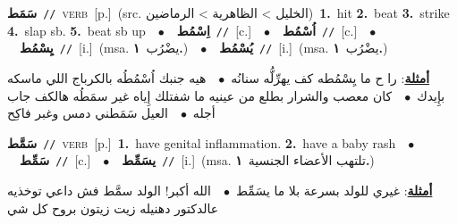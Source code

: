 \documentclass[10pt,a4paper,twoside]{article} %
\begin{document}
\begin{multicols}{2}
{\setlength\topsep{0pt}\textbf{\foreignlanguage{arabic}{سَمَط}}\ {\color{gray}\texttt{//}\color{black}}\ \textsc{verb}\ [p.]\ (src. \color{gray}\foreignlanguage{arabic}{الخليل > الظاهرية > الرماضين}\color{black})\ \textbf{1.}~hit  \textbf{2.}~beat  \textbf{3.}~strike  \textbf{4.}~slap sb.  \textbf{5.}~beat sb up\ \ $\bullet$\ \ \setlength\topsep{0pt}\textbf{\foreignlanguage{arabic}{اِسْمُط}}\ {\color{gray}\texttt{//}\color{black}}\ [c.]\ \ $\bullet$\ \ \setlength\topsep{0pt}\textbf{\foreignlanguage{arabic}{اُسْمُط}}\ {\color{gray}\texttt{//}\color{black}}\ [c.]\ \ $\bullet$\ \ \setlength\topsep{0pt}\textbf{\foreignlanguage{arabic}{يِسْمُط}}\ {\color{gray}\texttt{//}\color{black}}\ [i.]\ \color{gray}(msa. \foreignlanguage{arabic}{يضْرُب}~\foreignlanguage{arabic}{\textbf{١.}})\color{black}\ \ $\bullet$\ \ \setlength\topsep{0pt}\textbf{\foreignlanguage{arabic}{يُسْمُط}}\ {\color{gray}\texttt{//}\color{black}}\ [i.]\ \color{gray}(msa. \foreignlanguage{arabic}{يضْرُب}~\foreignlanguage{arabic}{\textbf{١.}})\color{black}\  \begin{flushright}\color{gray}\foreignlanguage{arabic}{\textbf{\underline{\foreignlanguage{arabic}{أمثلة}}}: را ح ما يِسْمُطه كف يهرِّلُّه سنانُه\ $\bullet$\ \  هيه جنبك اُسْمُطُه بالكرباج اللي ماسكه بإِيدك\ $\bullet$\ \  كان معصب والشرار بطلع من عينيه ما شفتلك إِياه غير سمَطُه هالكف جاب أجله\ $\bullet$\ \  العيل سَمَطني دمس وغبر فاكِح}\end{flushright}\color{black}} \vspace{2mm}

{\setlength\topsep{0pt}\textbf{\foreignlanguage{arabic}{سَمَّط}}\ {\color{gray}\texttt{//}\color{black}}\ \textsc{verb}\ [p.]\ \textbf{1.}~have genital inflammation.  \textbf{2.}~have a baby rash\ \ $\bullet$\ \ \setlength\topsep{0pt}\textbf{\foreignlanguage{arabic}{سَمِّط}}\ {\color{gray}\texttt{//}\color{black}}\ [c.]\ \ $\bullet$\ \ \setlength\topsep{0pt}\textbf{\foreignlanguage{arabic}{يسَمِّط}}\ {\color{gray}\texttt{//}\color{black}}\ [i.]\ \color{gray}(msa. \foreignlanguage{arabic}{تلتهب الأعضاء الجنسية}~\foreignlanguage{arabic}{\textbf{١.}})\color{black}\  \begin{flushright}\color{gray}\foreignlanguage{arabic}{\textbf{\underline{\foreignlanguage{arabic}{أمثلة}}}: غيري للولد بسرعة بلا ما يسَمِّط\ $\bullet$\ \  الله أكبر! الولد سمَّط فش داعي توخذيه عالدكتور دهنيله زيت زيتون بروح كل شي}\end{flushright}\color{black}} \vspace{2mm}


\end{multicols}
\end{document}
